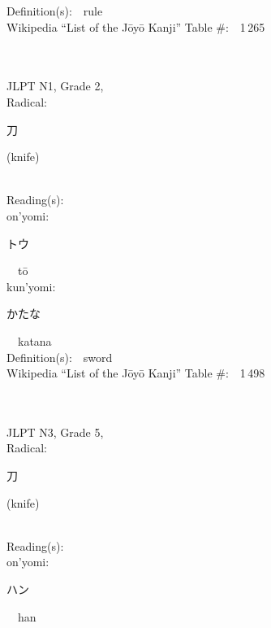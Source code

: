 \begin{multicols}{2}
Definition(s):\ \ rule \\
Wikipedia ``List of the J\=oy\=o Kanji'' Table \#:\ \ 1\,265 \\
\ \ \\
{\fontsize{34pt}{40pt}  }\ \ \\  %
{JLPT N1, Grade 2, \\Radical:\ \ {\begin{CJK}{UTF8}{min} 刀 \end{CJK}} (knife) } \\
Reading(s):\ \ \\
{\hspace*{1em}}on'yomi:\ \ \\
{\hspace*{2em}}{\begin{CJK}{UTF8}{min} トウ \end{CJK}}\ \ t\=o\ \ \\
{\hspace*{1em}}kun'yomi:\ \ \\
{\hspace*{2em}}{\begin{CJK}{UTF8}{min} かたな \end{CJK}}\ \ katana\ \ \\
Definition(s):\ \ sword \\
Wikipedia ``List of the J\=oy\=o Kanji'' Table \#:\ \ 1\,498 \\
\ \ \\
{\fontsize{34pt}{40pt}  }\ \ \\  %
{JLPT N3, Grade 5, \\Radical:\ \ {\begin{CJK}{UTF8}{min} 刀 \end{CJK}} (knife) } \\
Reading(s):\ \ \\
{\hspace*{1em}}on'yomi:\ \ \\
{\hspace*{2em}}{\begin{CJK}{UTF8}{min} ハン \end{CJK}}\ \ han\ \ \\

\end{multicols}
